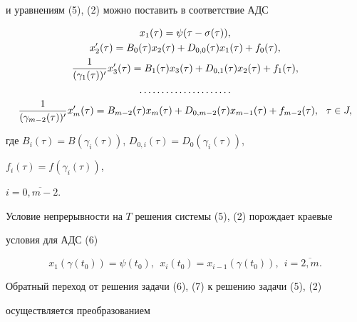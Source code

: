 и уравнениям (5), (2) можно поставить в соответствие АДС


\begin{gather}


x_1(\tau)= \psi(\tau - \sigma (\tau)), \notag \\


%


x'_2(\tau)=B_0(\tau)x_2(\tau)+D_{0,0}(\tau)x_1(\tau)+f_0 (\tau),\notag \\


%


\frac{1}{(\gamma_1(\tau))'}x'_3(\tau)=B_1(\tau)x_3(\tau)+


D_{0,1}(\tau)x_2(\tau)+f_1(\tau), \\


%


\dotsc\dotsc\dotsc\dotsc\dotsc\dotsc\dotsc \notag \\


%


\frac{1}{(\gamma_{m-2} (\tau))'}x'_m (\tau)=B_{m-2}(\tau)x_m(\tau) +


D_{0,m-2}(\tau)x_{m-1}(\tau)+f_{m-2}(\tau),\ \ \tau\in J,\notag


\end{gather}


где $B_i (\tau)=B(\gamma_i(\tau))$, $D_{0,i}(\tau)=D_0(\gamma_i (\tau))$,


$f_i(\tau)=f(\gamma_i(\tau))$,


$i=\overline{0,m-2}$. 





Условие непрерывности на $T$ решения системы (5), (2) порождает краевые


условия для АДС (6)


\begin{equation}


x_1(\gamma(t_0))=\psi(t_0),\ \


x_i (t_0)=x_{i-1}(\gamma(t_0)),\ \ i=\overline{2,m}.


\end{equation}





Обратный переход от решения задачи (6), (7) к решению задачи (5), (2)


осуществляется преобразованием



